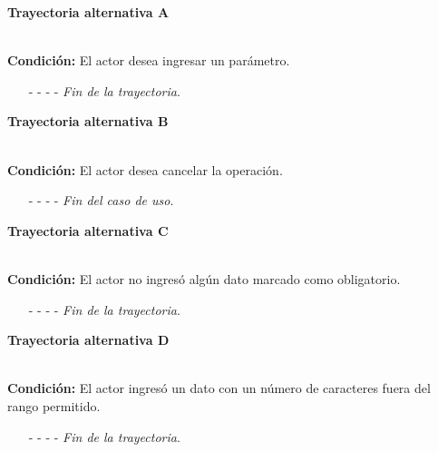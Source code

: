 \hypertarget{CU9-1:TAA}{\textbf{Trayectoria alternativa A}}\\
\noindent \textbf{Condición:} El actor desea ingresar un parámetro.
\begin{enumerate}
	\UCpaso[\UCactor] Ingresa el token ''PARAM·''.
	\UCpaso[\UCsist] Muestra la pantalla .
	\UCpaso[\UCsist] Marca como etiqueta el campo ''Clave'' de acuerdo a la regla de negocio .
	\UCpaso[\UCactor] Ingresa la descripción de cada parámetro. \label{CU9.1-TA2}
	\UCpaso[\UCsist] Continúa en el paso \ref{CU9.1-P4} de la trayectoria principal.
	\item[- -] - - {\em {Fin de la trayectoria}}.%
\end{enumerate}
\hypertarget{CU9-1:TAB}{\textbf{Trayectoria alternativa B}}\\
\noindent \textbf{Condición:} El actor desea cancelar la operación.
\begin{enumerate}
	\UCpaso[\UCactor] Solicita cancelar la operación oprimiendo el botón  de la pantalla .
	\UCpaso[\UCsist] Muestra la pantalla .
	\item[- -] - - {\em {Fin del caso de uso}}.%
\end{enumerate}
\hypertarget{CU9-1:TAC}{\textbf{Trayectoria alternativa C}}\\
\noindent \textbf{Condición:} El actor no ingresó algún dato marcado como obligatorio.
\begin{enumerate}
	\UCpaso[\UCsist] Muestra el mensaje  señalando el campo que presenta el error en la pantalla .
	\UCpaso Regresa al paso \ref{CU9.1-P3} de la trayectoria principal o al paso \ref{CU9.1-TA2} de la trayectoria Alternativa A.
	\item[- -] - - {\em {Fin de la trayectoria}}.%
\end{enumerate}
\hypertarget{CU9-1:TAD}{\textbf{Trayectoria alternativa D}}\\
\noindent \textbf{Condición:} El actor ingresó un dato con un número de caracteres fuera del rango permitido.
\begin{enumerate}
	\UCpaso[\UCsist] Muestra el mensaje  señalando el campo que presenta el error en la pantalla .
	\UCpaso Regresa al paso \ref{CU9.1-P3} de la trayectoria principal al paso \ref{CU9.1-TA2} de la trayectoria Alternativa A.
	\item[- -] - - {\em {Fin de la trayectoria}}.%
\end{enumerate}
